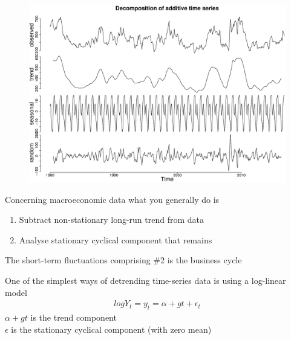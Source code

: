 \documentclass{beamer}
\begin{document}
\begin{frame}
  \begin{figure}
    \includegraphics[scale=.3]{rice3.eps}
  \end{figure}
\end{frame}

\begin{frame}
  Concerning macroeconomic data what you generally do is
  \begin{enumerate}
    \item Subtract non-stationary long-run trend from data
    \item Analyse stationary cyclical component that remains
  \end{enumerate}
  \medskip
  The short-term fluctuations comprising \#2 is the business cycle
\end{frame}


\begin{frame}
  One of the simplest ways of detrending time-series data is using a log-linear model
  \begin{align}
    log Y_t = y_t = \alpha +gt + \epsilon_t
  \end{align}
  \medskip
  $\alpha+gt$ is the trend component\\
  $\epsilon$ is the stationary cyclical component (with zero mean)
\end{frame}
\end{document}
